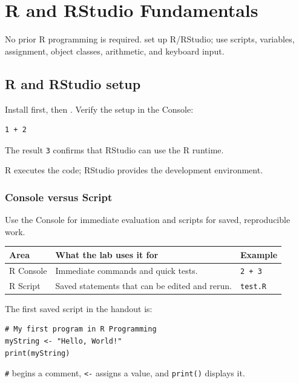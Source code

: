 \chapter{R and RStudio Fundamentals}
\label{chap:r-basics}

\chapterguide
  {No prior R programming is required.}
  {set up R/RStudio; use scripts, variables, assignment, object classes, arithmetic, and keyboard input.}

\section{R and RStudio setup}

Install  first, then . Verify the setup in the Console:

\begin{lstlisting}[style=dsr]
1 + 2
\end{lstlisting}

The result \texttt{3} confirms that RStudio can use the R runtime.

\begin{keyidea}
R executes the code; RStudio provides the development environment.
\end{keyidea}

\subsection{Console versus Script}

Use the Console for immediate evaluation and scripts for saved, reproducible work.

\begin{dstable}
\begin{tabularx}{\linewidth}{@{}p{3.0cm}X X@{}}
\toprule
\rowcolor{DSPaleBlue!92}
Area & What the lab uses it for & Example \\
\midrule
R Console & Immediate commands and quick tests. & \texttt{2 + 3} \\
R Script & Saved statements that can be edited and rerun. & \texttt{test.R} \\
\bottomrule
\end{tabularx}
\end{dstable}

\begin{workedexample}
The first saved script in the handout is:
\begin{lstlisting}[style=dsr]
# My first program in R Programming
myString <- "Hello, World!"
print(myString)
\end{lstlisting}
\texttt{\#} begins a comment, \texttt{<-} assigns a value, and \texttt{print()} displays it.
\end{workedexample}

